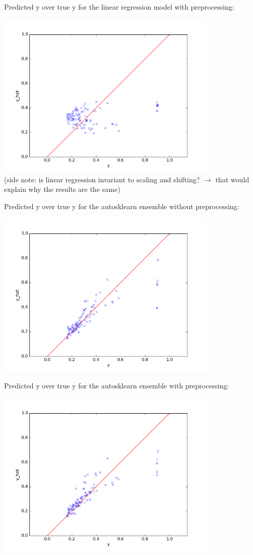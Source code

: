 \documentclass[a4paper,10pt]{article}
\begin{document}
Predicted y over true y for the linear regression model with preprocessing:

\includegraphics[width=0.8\textwidth]{../../figures/baseline_LinearRegression_standardized_predictions} \\
(side note: is linear regression invariant to scaling and shifting? $\rightarrow$ that would explain why the results are the same)

\vspace{0.5cm}
Predicted y over true y for the autosklearn ensemble without preprocessing:

\includegraphics[width=0.8\textwidth]{../../figures/baseline_autosklearn_60s_predictions}

Predicted y over true y for the autosklearn ensemble with preprocessing:

\includegraphics[width=0.8\textwidth]{../../figures/baseline_autosklearn_60s_standardized_predictions}
\end{document}

